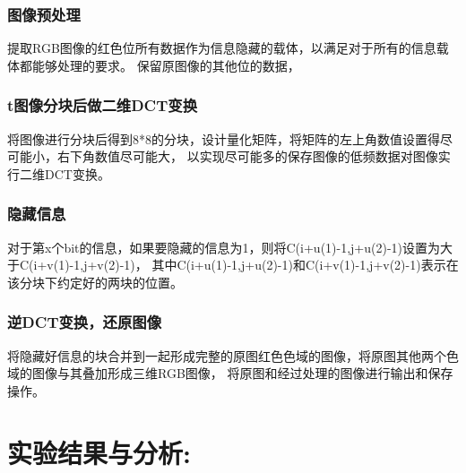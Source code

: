 \documentclass[a4paper,11pt,UTF8]{ctexart}
\begin{document}
    \subsubsection{图像预处理}
      提取RGB图像的红色位所有数据作为信息隐藏的载体，以满足对于所有的信息载体都能够处理的要求。
      保留原图像的其他位的数据，
    \subsubsection{t图像分块后做二维DCT变换}
      将图像进行分块后得到8*8的分块，设计量化矩阵，将矩阵的左上角数值设置得尽可能小，右下角数值尽可能大，
      以实现尽可能多的保存图像的低频数据对图像实行二维DCT变换。
    \subsubsection{隐藏信息}
      对于第x个bit的信息，如果要隐藏的信息为1，则将C(i+u(1)-1,j+u(2)-1)设置为大于C(i+v(1)-1,j+v(2)-1)，
      其中C(i+u(1)-1,j+u(2)-1)和C(i+v(1)-1,j+v(2)-1)表示在该分块下约定好的两块的位置。
    \subsubsection{逆DCT变换，还原图像}
      将隐藏好信息的块合并到一起形成完整的原图红色色域的图像，将原图其他两个色域的图像与其叠加形成三维RGB图像，
      将原图和经过处理的图像进行输出和保存操作。

\newpage
\section{实验结果与分析:}
\end{document}
